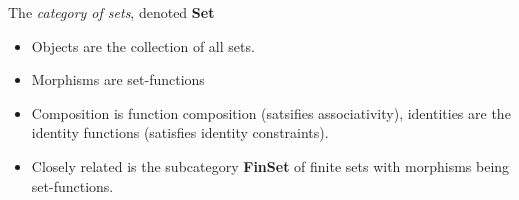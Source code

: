 
The \emph{category of sets}, denoted \textbf{Set}

\begin{itemize}
    \item Objects are the collection of all sets.
    \item Morphisms are set-functions
    \item Composition is function composition (satsifies associativity), identities are the identity functions (satisfies identity constraints).
    \item Closely related is the subcategory \textbf{FinSet} of finite sets with morphisms being set-functions.

  \end{itemize}
